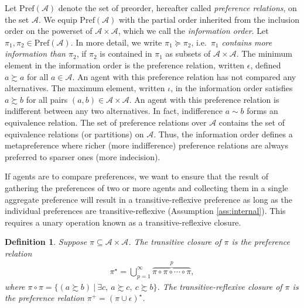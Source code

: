 \documentclass[conference]{ieeeconf}
\newcommand{\powerset}[1]{2^{#1}}
\newcommand{\A}{\mathcal{A}}
\newcommand{\X}{\mathcal{X}}
\newcommand{\Pref}{\mathrm{Pref}}
\newcommand{\prefers}{\succsim}
\DeclareMathOperator{\cl}{cl}
\DeclareMathOperator{\Cl}{Cl}
\newtheorem{definition}{Definition}
\begin{document}
Let $\Pref(\A)$ denote the set of preorder, hereafter called \emph{preference relations}, on the set $\A$. We equip $\Pref(\A)$ with the partial order inherited from the inclusion order on the powerset of $\A \times \A$, which we call the \emph{information order}. Let $\pi_1, \pi_2 \in \Pref(\A)$. In more detail, we write $\pi_1 \succeq \pi_2$, i.e.~{\it $\pi_1$ contains more information than $\pi_2$}, if $\pi_2$ is contained in $\pi_1$ as subsets of $\A \times \A$. The minimum element in the information order is the preference relation, written $\epsilon$, defined $a \prefers a$ for all $a \in \A$. An agent with this preference relation has not compared any alternatives. The maximum element, written $\iota$, in the information order satisfies $a \prefers b$ for all pairs $(a,b) \in \A \times \A$. An agent with this preference relation is indifferent between any two alternatives. In fact, indifference $a \sim b$ forms an equivalence relation. The set of preference relations over $\A$ contains the set of equivalence relations (or partitions) on $\A$. Thus, the information order defines a metapreference where richer (more indifference) preference relations are always preferred to sparser ones (more indecision).

If agents are to compare preferences, we want to ensure that the result of gathering the preferences of two or more agents and collecting them in a single aggregate preference will result in a transitive-reflexive preference as long as the individual preferences are transitive-reflexive (Assumption \ref{ass:internal}). This requires a unary operation known as a transitive-reflexive closure.
\begin{definition}
    Suppose $\pi \subseteq \A \times \A$. The \emph{transitive closure} of $\pi$ is the preference relation 
\begin{align}
    \pi^{\star} = \bigcup_{p=1}^{\infty} \overbrace{\pi \circ \pi \circ \cdots \circ \pi}^{p}, \label{eq:transitive-closure}
\end{align}
where $\pi \circ \pi = \{ (a \prefers b)~\vert~\exists c,~a \prefers c,~c \prefers b\}$. The \emph{transitive-reflexive closure} of $\pi$ is the preference relation $\pi^{+} = \left( \pi \cup \epsilon \right)^\star$.
\end{definition}

\end{document}
